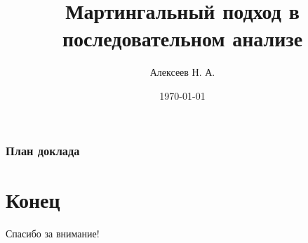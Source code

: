 \documentclass{beamer}
\title[Обобщение критерия Вальда]{Мартингальный подход в последовательном анализе}
\author[Алексеев Н. А.]{Алексеев Н. А.}
\institute[МГУ]{МГУ им. М.В. Ломоносова}
\date{\today}
\begin{document}
\begin{frame}
    \titlepage
\end{frame}

\begin{frame}
    \frametitle{План доклада} 
    \tableofcontents 
\end{frame}









\section{Конец}
\begin{frame}
    \begin{center}
        {\Huge Спасибо за внимание!}
    \end{center}
\end{frame}
\end{document}
